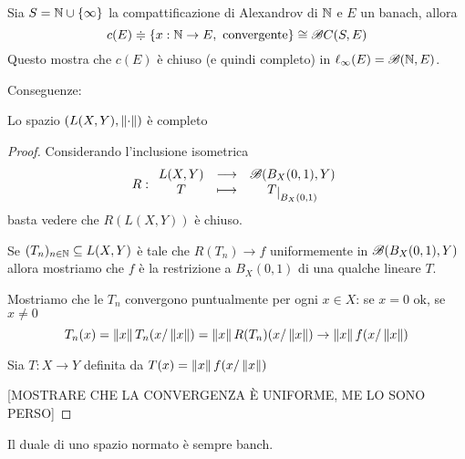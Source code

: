 \begin{example}
Sia $S=\mathbb{N}\cup\left\{{\infty}\right\}$ la compattificazione di Alexandrov di $\mathbb{N}$ e $E$ un banach, allora
\[c(E)\doteqdot\left\{{x:\mathbb{N}\to E,\text{ convergente}}\right\}\cong \mathscr{B} C(S,E)\]
Questo mostra che $c(E)$ \`e chiuso (e quindi completo) in $\ell_\infty(E)=\mathscr{B}(\mathbb{N},E)$.
\end{example}


Conseguenze:
\begin{proposition}
Lo spazio $(L(X,Y),\left\Vert{\cdot}\right\Vert)$ \`e completo
\end{proposition}
\begin{proof}
Considerando l'inclusione isometrica 
\[R:\funcDef{L(X,Y)}{\Bs(B_X(0,1),Y)}{T}{T\res{B_X(0,1)}}\]
basta vedere che $R(L(X,Y))$ \`e chiuso.

Se $(T_n)_{n\in\mathbb{N}}\subseteq L(X,Y)$ \`e tale che $R(T_n)\to f$ uniformemente in $\mathscr{B}(B_X(0,1),Y)$ allora mostriamo che $f$ \`e la restrizione a $B_X(0,1)$ di una qualche lineare $T$.

Mostriamo che le $T_n$ convergono puntualmente per ogni $x\in X$: se $x=0$ ok, se $x\neq 0$
\[T_n(x)=\left\Vert{x}\right\Vert T_n(x/\left\Vert{x}\right\Vert)=\left\Vert{x}\right\Vert R(T_n)(x/\left\Vert{x}\right\Vert)\to \left\Vert{x}\right\Vert f(x/\left\Vert{x}\right\Vert)\]

Sia $T:X\to Y$ definita da $T(x)=\left\Vert{x}\right\Vert f(x/\left\Vert{x}\right\Vert)$

[MOSTRARE CHE LA CONVERGENZA \`E UNIFORME, ME LO SONO PERSO]
\end{proof}

\begin{corollary}\label{CorDualeNormatoEBanach}
Il duale di uno spazio normato \`e sempre banch.
\end{corollary}

